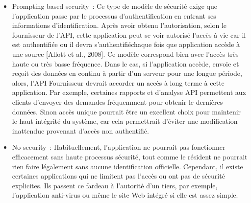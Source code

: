 \begin{itemize}
\begin{itemize}
 \end{itemize}
 \item Prompting based security : Ce type de modèle de sécurité exige que l'application passe par le processus d'authentification en entrant ses informations d'identification. Après avoir obtenu l'autorisation, selon le fournisseur de l'API, cette application peut se voir autorisé l’accès à vie car il est authentifiée ou il devra s'authentifiéchaque fois que application accède à une source [Allott et al., 2008]. Ce modèle correspond bien avec l'accès très haute ou très basse fréquence. Dans le cas, si l'application accède, envoie et reçoit des données en continu à partir d'un serveur pour une longue période, alors, l'API Fournisseur devrait accorder un accès à long terme à cette application. Par exemple, certaines rapports et d'analyse API permettent aux clients d'envoyer des demandes fréquemment pour obtenir le dernières données. Sinon accès unique pourrait être un excellent choix pour maintenir le haut intégrité du système, car cela permettrait d'éviter une modification inattendue provenant  d'accès non authentifié.
 \item No security : Habituellement, l'application ne pourrait pas fonctionner efficacement sans haute processus  sécurité, tout comme le résident ne pourrait rien faire légalement sans aucune identification officielle. Cependant, il existe certaines applications qui ne limitent pas l'accès ou ont pas de sécurité explicites. Ils passent ce fardeau à l'autorité d'un tiers, par exemple, l'application anti-virus ou même le site Web intégré si elle est assez simple.
 \end{itemize}
